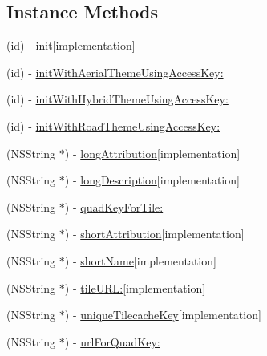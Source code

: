 \subsection*{Instance Methods}
\begin{DoxyCompactItemize}
\item 
(id) -\/ \hyperlink{interface_r_m_virtual_earth_source_ac5adb7466431cc74785b23ccda89043a}{init}{\ttfamily  \mbox{[}implementation\mbox{]}}
\item 
(id) -\/ \hyperlink{interface_r_m_virtual_earth_source_a1c663344b78f2908bfb2c6277b93ed36}{init\-With\-Aerial\-Theme\-Using\-Access\-Key\-:}
\item 
(id) -\/ \hyperlink{interface_r_m_virtual_earth_source_a12decc3d0477d2a851983e6cf7f4549b}{init\-With\-Hybrid\-Theme\-Using\-Access\-Key\-:}
\item 
(id) -\/ \hyperlink{interface_r_m_virtual_earth_source_aba3830cc7be0a5d28f79f5d40683d24d}{init\-With\-Road\-Theme\-Using\-Access\-Key\-:}
\item 
(N\-S\-String $\ast$) -\/ \hyperlink{interface_r_m_virtual_earth_source_aecb9344a0ea17a52805f4b275bf99f53}{long\-Attribution}{\ttfamily  \mbox{[}implementation\mbox{]}}
\item 
(N\-S\-String $\ast$) -\/ \hyperlink{interface_r_m_virtual_earth_source_aed0c86e17a29274bcd6749f9eaf8b0ba}{long\-Description}{\ttfamily  \mbox{[}implementation\mbox{]}}
\item 
(N\-S\-String $\ast$) -\/ \hyperlink{interface_r_m_virtual_earth_source_a2f208d7f37321c7f7136bb109e80f7da}{quad\-Key\-For\-Tile\-:}
\item 
(N\-S\-String $\ast$) -\/ \hyperlink{interface_r_m_virtual_earth_source_a2571b1d3e25fa9ebacb40dca3d2bde8b}{short\-Attribution}{\ttfamily  \mbox{[}implementation\mbox{]}}
\item 
(N\-S\-String $\ast$) -\/ \hyperlink{interface_r_m_virtual_earth_source_a3a9b18977a6a266312d7e4d79441b52f}{short\-Name}{\ttfamily  \mbox{[}implementation\mbox{]}}
\item 
(N\-S\-String $\ast$) -\/ \hyperlink{interface_r_m_virtual_earth_source_ae5d08adc0e9d810956f4f81a9fbf6681}{tile\-U\-R\-L\-:}{\ttfamily  \mbox{[}implementation\mbox{]}}
\item 
(N\-S\-String $\ast$) -\/ \hyperlink{interface_r_m_virtual_earth_source_a8b7b461c2e4a8a89d51ca08e6d9d7628}{unique\-Tilecache\-Key}{\ttfamily  \mbox{[}implementation\mbox{]}}
\item 
(N\-S\-String $\ast$) -\/ \hyperlink{interface_r_m_virtual_earth_source_a70d695ce75555dff093fa307aa979d7a}{url\-For\-Quad\-Key\-:}
\end{DoxyCompactItemize}
